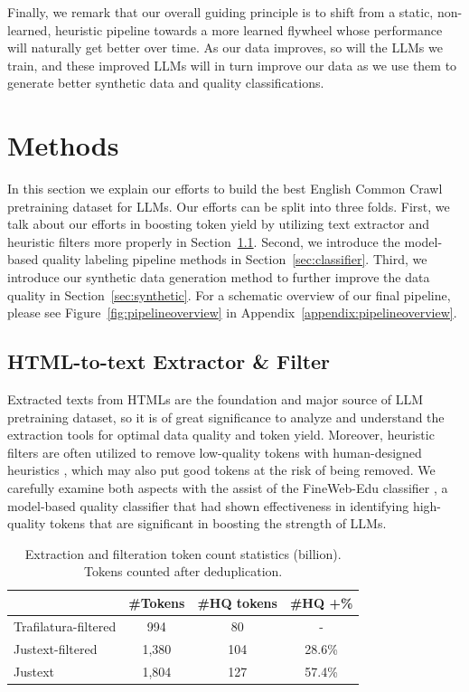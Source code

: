 \documentclass[11pt]{article}
\begin{document}
Finally, we remark that our overall guiding principle is to shift from a static, non-learned, heuristic pipeline towards a more learned flywheel whose performance will naturally get better over time. As our data improves, so will the LLMs we train, and these improved LLMs will in turn improve our data as we use them to generate better synthetic data and quality classifications.

\section{Methods}

In this section we explain our efforts to build the best English Common Crawl pretraining dataset for LLMs. Our efforts can be split into three folds. First, we talk about our efforts in boosting token yield by utilizing text extractor and heuristic filters more properly in Section~\ref{sec:extract_filter}. Second, we introduce the model-based quality labeling pipeline methods in Section~\ref{sec:classifier}. Third, we introduce our synthetic data generation method to further improve the data quality in Section~\ref{sec:synthetic}. For a schematic overview of our final pipeline, please see Figure~\ref{fig:pipelineoverview} in Appendix~\ref{appendix:pipelineoverview}.

\subsection{HTML-to-text Extractor \& Filter} \label{sec:extract_filter}
Extracted texts from HTMLs are the foundation and major source of LLM pretraining dataset, so it is of great significance to analyze and understand the extraction tools for optimal data quality and token yield. Moreover, heuristic filters are often utilized to remove low-quality tokens with human-designed heuristics \citep{li2024datacomp,parmar2024data,penedo2024fineweb,dubey2024llama}, which may also put good tokens at the risk of being removed. We carefully examine both aspects with the assist of the FineWeb-Edu classifier \citep{penedo2024fineweb}, a model-based quality classifier that had shown effectiveness in identifying high-quality tokens that are significant in boosting the strength of LLMs.

\begin{table}[htbp] \small \centering
\begin{tabular}{@{}lccc@{}}
\toprule  
                     & \textbf{\#Tokens} & \textbf{\#HQ tokens} & \textbf{\#HQ +\%} \\ \midrule
Trafilatura-filtered & 994              & 80                  & -                       \\
Justext-filtered     & 1,380            & 104                 & 28.6\%                  \\
Justext              & 1,804            & 127                 & 57.4\%                  \\ \bottomrule
\end{tabular}
\caption{Extraction and filteration token count statistics (billion). Tokens counted after deduplication.}
\label{table:extract_filter_stats}
\end{table}
\end{document}
